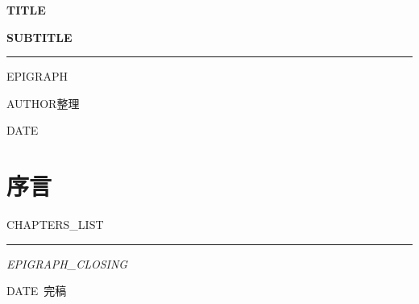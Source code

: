 \documentclass[a4paper, 11pt, twoside]{ctexrep}
\begin{document}
\thispagestyle{empty}
\begin{center}
\vspace*{5cm}
{\Huge\bfseries {{TITLE}}\par}
\vspace{0.8cm}
{\Large\bfseries {{SUBTITLE}}\par}
\vspace{1.5cm}
\rule{0.7\textwidth}{0.4pt}\par
\vspace{1cm}
{\large {{EPIGRAPH}}\par}
\vspace{4cm}
{\large {{AUTHOR}}\quad 整理\par}
\vspace{0.8cm}
{\large {{DATE}}\par}
\end{center}
\newpage

\thispagestyle{empty}
\chapter*{序\quad 言}


\newpage

\thispagestyle{empty}
\renewcommand{\contentsname}{目\quad 录}
\tableofcontents
\newpage

{{CHAPTERS_LIST}}


\vspace{2em}
\begin{center}
\rule{0.5\textwidth}{0.4pt}\par
\vspace{0.5cm}
{\large\itshape {{EPIGRAPH_CLOSING}}\par}
\vspace{0.3cm}
{\small {{DATE}}\ 完稿\par}
\end{center}
\end{document}
